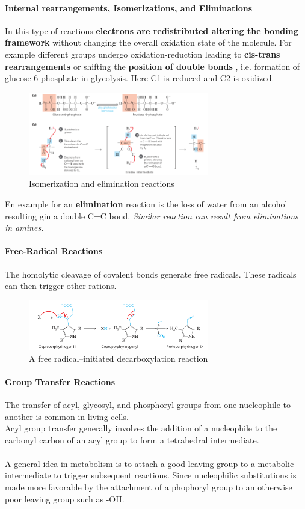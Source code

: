 \documentclass[../main.tex]{subfiles}
\begin{document}
\paragraph{Internal rearrangements, Isomerizations, and Eliminations}
In this type of reactions \textbf{electrons are redistributed altering the bonding framework} without changing the overall oxidation state of the molecule. For example different groups undergo oxidation-reduction leading to \textbf{cis-trans rearrangements} or shifting the \textbf{position of double bonds} , i.e. formation of glucose 6-phosphate in glycolysis. Here C1 is reduced and C2 is oxidized. 
\begin{figure}[H]
	\centering
	\includegraphics[width=0.7\textwidth]{changeposition}
	\caption{Isomerization and elimination reactions}
\end{figure}
En example for an \textbf{elimination} reaction is the loss of water from an alcohol resulting gin a double C=C bond. \textit{Similar reaction can result from eliminations in amines.}

\paragraph{Free-Radical Reactions}
The homolytic cleavage of covalent bonds generate free radicals. These radicals can then trigger other rations.   
\begin{figure}[H]
	\centering
	\includegraphics[width=0.7\textwidth]{radicals}
	\caption{A free radical–initiated decarboxylation reaction}
\end{figure}

\paragraph{Group Transfer Reactions}
The transfer of acyl, glycosyl, and phosphoryl groups from one nucleophile to another is common in living cells. \\
Acyl group transfer generally involves the addition of a nucleophile to the carbonyl carbon of an acyl group to form a tetrahedral intermediate.  \\
\\
A general idea in metabolism is to attach a good leaving group to a metabolic intermediate to trigger subsequent reactions. Since nucleophilic substitutions is made more favorable by the attachment of a phophoryl group to an otherwise poor leaving group such as -OH. \\
\end{document}
